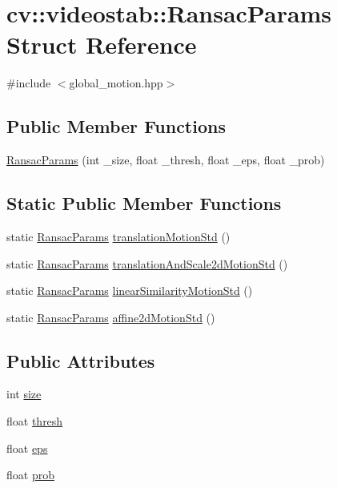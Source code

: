 \hypertarget{structcv_1_1videostab_1_1RansacParams}{\section{cv\-:\-:videostab\-:\-:Ransac\-Params Struct Reference}
\label{structcv_1_1videostab_1_1RansacParams}
}


{\ttfamily \#include $<$global\-\_\-motion.\-hpp$>$}

\subsection*{Public Member Functions}
\begin{DoxyCompactItemize}
\item 
\hyperlink{structcv_1_1videostab_1_1RansacParams_aa425c019b4dcc34e9bddba7c6bfa82a0}{Ransac\-Params} (int \-\_\-size, float \-\_\-thresh, float \-\_\-eps, float \-\_\-prob)
\end{DoxyCompactItemize}
\subsection*{Static Public Member Functions}
\begin{DoxyCompactItemize}
\item 
static \hyperlink{structcv_1_1videostab_1_1RansacParams}{Ransac\-Params} \hyperlink{structcv_1_1videostab_1_1RansacParams_aec96943849c8f38f167f55a192cb2978}{translation\-Motion\-Std} ()
\item 
static \hyperlink{structcv_1_1videostab_1_1RansacParams}{Ransac\-Params} \hyperlink{structcv_1_1videostab_1_1RansacParams_a11f2f5d8e48341bb5f6792693f37a010}{translation\-And\-Scale2d\-Motion\-Std} ()
\item 
static \hyperlink{structcv_1_1videostab_1_1RansacParams}{Ransac\-Params} \hyperlink{structcv_1_1videostab_1_1RansacParams_ad2f957811f8573a935e88ad514fa8017}{linear\-Similarity\-Motion\-Std} ()
\item 
static \hyperlink{structcv_1_1videostab_1_1RansacParams}{Ransac\-Params} \hyperlink{structcv_1_1videostab_1_1RansacParams_a373dda5c8cb8882cce9e52bee1827f55}{affine2d\-Motion\-Std} ()
\end{DoxyCompactItemize}
\subsection*{Public Attributes}
\begin{DoxyCompactItemize}
\item 
int \hyperlink{structcv_1_1videostab_1_1RansacParams_a1c3369153b15c7f673d2afd5b07a55c1}{size}
\item 
float \hyperlink{structcv_1_1videostab_1_1RansacParams_a2558a62a1e6b2ad8f47222f175348a6b}{thresh}
\item 
float \hyperlink{structcv_1_1videostab_1_1RansacParams_a12a0a87af93c54e5b9dd67aea517d2dd}{eps}
\item 
float \hyperlink{structcv_1_1videostab_1_1RansacParams_aa43b08b4dfbc551b19f1217f8c67f5ca}{prob}
\end{DoxyCompactItemize}


